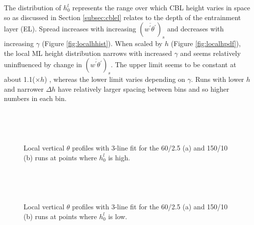 The distribution of $h_{0}^{l}$ represents the range over which \acs{CBL} height varies in space so as 
discussed in Section \ref{subsec:cblel} relates to the depth of the entrainment layer (\acs{EL}).
Spread increases with increasing $(\overline{w^{'}\theta^{'}})_{s}$ and decreases with increasing $\gamma$
(Figure \ref{fig:localhhist}).  When scaled by $h$  (Figure \ref{fig:localhpdf}), the local \acs{ML} height distribution 
narrows with increased $\gamma$ and seems relatively uninfluenced by change in $(\overline{w^{'}\theta^{'}})_{s}$.  
The upper limit seems to be constant at about 1.1($\times h$) , whereas the lower limit varies 
depending on $\gamma$.   Runs with lower $h$ and narrower $\Delta h$ have relatively 
larger spacing between bins and so higher numbers in each bin.\\

\begin{figure}[htbp]
\begin{minipage}[b]{0.5\linewidth}
        \\
        \end{minipage}             
\quad
\begin{minipage}[b]{0.5\linewidth}
        \\
       
       \end{minipage}
        \caption[High local \acs{ML}]{Local vertical $\theta$ profiles with 3-line fit for the 60/2.5 (a) and 150/10 (b) runs at 
points where $h^{l}_{0}$ is high.}
        \label{fig:rssfitshigh}
\end{figure}

\begin{figure}[htbp]
\begin{minipage}[b]{0.5\linewidth}
        \\
        \end{minipage}             
\quad
\begin{minipage}[b]{0.5\linewidth}
        \\
       
       \end{minipage}
        \caption[Low local \acs{ML}]{Local vertical $\theta$ profiles with 3-line fit for the 60/2.5 (a) and 150/10 (b) runs at 
points where $h^{l}_{0}$ is low.}
        \label{fig:rssfitslow}
\end{figure}

